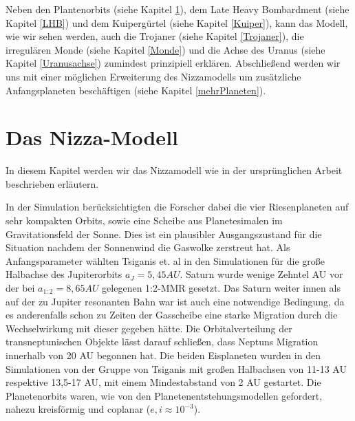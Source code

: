 \documentclass[10pt,a4paper,twoside]{article}
\newcommand{\refsec}[1]{siehe Kapitel \ref{#1}}
\begin{document}
Neben den Plantenorbits (\refsec{Orbits}), dem Late Heavy Bombardment (\refsec{LHB}) und dem Kuipergürtel (\refsec{Kuiper}), kann das Modell, wie wir sehen werden, auch die Trojaner (\refsec{Trojaner}), die irregulären Monde (\refsec{Monde}) und die Achse des Uranus (\refsec{Uranusachse}) zumindest prinzipiell erklären.
Abschließend werden wir uns mit einer möglichen Erweiterung des Nizzamodells um zusätzliche Anfangsplaneten beschäftigen (\refsec{mehrPlaneten}).

\FloatBarrier
\section{Das Nizza-Modell}\label{Orbits}
In diesem Kapitel werden wir das Nizzamodell wie in der ursprünglichen Arbeit\cite{Tsiganis2005} beschrieben erläutern. %

In der Simulation berücksichtigten die Forscher dabei die vier Riesenplaneten auf sehr kompakten Orbits, sowie eine Scheibe aus Planetesimalen im Gravitationsfeld der Sonne. %
Dies ist ein plausibler Ausgangszustand für die Situation nachdem der Sonnenwind die Gaswolke %
zerstreut hat. %
Als Anfangsparameter wählten Tsiganis et. al in den Simulationen für die große Halbachse des Jupiterorbits $a_J = 5,45 AU$. Saturn wurde wenige Zehntel AU vor der bei $a_{1:2} = 8,65 AU$ gelegenen 1:2-MMR gesetzt\cite{Tsiganis2005}.%
Das Saturn weiter innen als auf der zu Jupiter resonanten Bahn war ist auch eine notwendige Bedingung, da es anderenfalls schon zu Zeiten der Gasscheibe eine starke Migration durch die Wechselwirkung mit dieser gegeben hätte\cite{Levison2008}. %
Die Orbitalverteilung der transneptunischen Objekte lässt darauf schließen, dass Neptuns Migration innerhalb von 20 AU begonnen hat\cite{Tsiganis2005}.
Die beiden Eisplaneten wurden in den Simulationen von der Gruppe von Tsiganis mit großen Halbachsen von 11-13 AU respektive 13,5-17 AU, mit einem Mindestabstand von 2 AU gestartet.
Die Planetenorbits waren, wie von den Planetenentstehungsmodellen gefordert, %
nahezu kreisförmig und coplanar ($e, i \approx 10^{-3}$).
\end{document}
